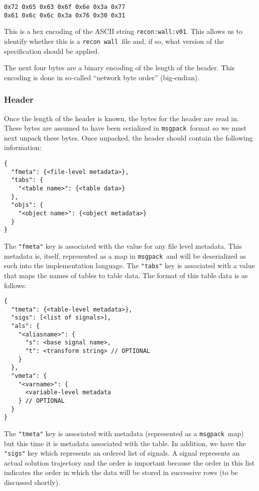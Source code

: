 \documentclass[11pt,a4paper,twocolumn]{article}
\newcommand{\recon}{\texttt{recon}}
\newcommand{\wall}{\texttt{wall}}
\newcommand{\msgpack}{\texttt{msgpack}}
\newcommand{\code}[1]{\texttt{#1}} %
\begin{document}
\begin{verbatim}
0x72 0x65 0x63 0x6f 0x6e 0x3a 0x77
0x61 0x6c 0x6c 0x3a 0x76 0x30 0x31
\end{verbatim}

This is a hex encoding of the ASCII string \code{recon:wall:v01}.
This allows us to identify whether this is a \recon\ \wall\ file and, if
so, what version of the specification should be applied.

The next four bytes are a binary encoding of the length of the header.
This encoding is done in so-called ``network byte order''
(big-endian).

\subsubsection{Header}

Once the length of the header is known, the bytes for the header are
read in.  These bytes are assumed to have been serialized in
\msgpack\ format so we must next unpack these bytes.  Once unpacked,
the header should contain the following information:

\begin{verbatim}
{
  "fmeta": {<file-level metadata>},
  "tabs": {
    "<table name>": {<table data>}
  },
  "objs": {
    "<object name>": {<object metadata>}
  }
}
\end{verbatim}

The \code{"fmeta"} key is associated with the value for any file level
metadata.  This metadata is, itself, represented as a map in
\msgpack\ and will be deserialized as such into the implementation
language.  The \code{"tabs"} key is associated with a value that maps
the names of tables to table data.  The format of this table data is
as follows:

\begin{verbatim}
{
  "tmeta": {<table-level metadata>},
  "sigs": [<list of signals>],
  "als": {
    "<aliasname>": {
      "s": <base signal name>,
      "t": <transform string> // OPTIONAL
    }
  },
  "vmeta": {
    "<varname>": {
      <variable-level metadata
    } // OPTIONAL
  }
}
\end{verbatim}

The \code{"tmeta"} key is associated with metadata (represented as a
\msgpack\ map) but this time it is metadata associated with the table.
In addition, we have the \code{"sigs"} key which represents an ordered
list of signals.  A signal represents an actual solution trajectory
and the order is important because the order in this list indicates
the order in which the data will be stored in successive rows (to be
discussed shortly).
\end{document}
